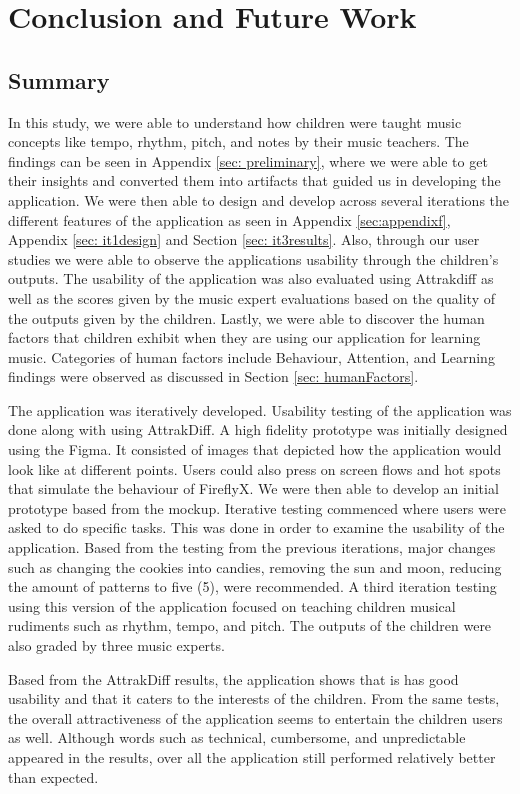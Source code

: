 \chapter{Conclusion and Future Work}
\section{Summary}
In this study, we were able to understand how children were taught music concepts like tempo, rhythm, pitch, and notes by their music teachers. The findings can be seen in Appendix \ref{sec: preliminary}, where we were able to get their insights and converted them into artifacts that guided us in developing the application. We were then able to design and develop across several iterations the different features of the application as seen in Appendix \ref{sec:appendixf}, Appendix \ref{sec: it1design} and Section \ref{sec: it3results}. Also, through our user studies we were able to observe the applications usability through the children's outputs. The usability of the application was also evaluated using Attrakdiff as well as the scores given by the music expert evaluations based on the quality of the outputs given by the children. Lastly, we were able to discover the human factors that children exhibit when they are using our application for learning music. Categories of human factors include Behaviour, Attention, and Learning findings were observed as discussed in Section \ref{sec: humanFactors}.

The application was iteratively developed. Usability testing of the application was done along with using AttrakDiff. A high fidelity prototype was initially designed using the Figma. It consisted of images that depicted how the application would look like at different points. Users could also press on screen flows and hot spots that simulate the behaviour of FireflyX. We were then able to develop an initial prototype based from the mockup. Iterative testing commenced where users were asked to do specific tasks. This was done in order to examine the usability of the application. Based from the testing from the previous iterations, major changes such as changing the cookies into candies, removing the sun and moon, reducing the amount of patterns to five (5), were recommended. A third iteration testing using this version of the application focused on teaching children musical rudiments such as rhythm, tempo, and pitch. The outputs of the children were also graded by three music experts.

Based from the AttrakDiff results, the application shows that is has good usability and that it caters to the interests of the children. From the same tests, the overall attractiveness of the application seems to entertain the children users as well. Although words such as technical, cumbersome, and unpredictable appeared in the results, over all the application still performed relatively better than expected. 

